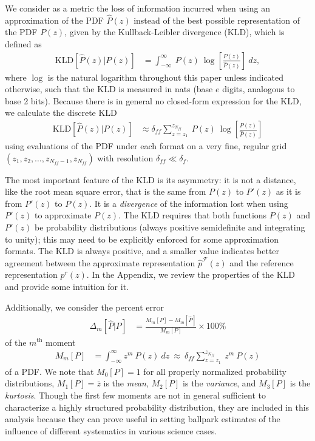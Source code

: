 \documentclass[\docopts]{\docclass}
\begin{document}
We consider as a metric the loss of information incurred when using an 
approximation of the PDF $\hat{P}(z)$ instead of the best possible 
representation of the  PDF $P(z)$, given by the Kullback-Leibler divergence 
(KLD), which is defined as
\begin{align}
  \label{eq:kld}
  \mathrm{KLD}[\hat{P}(z) | P(z)] &= \int_{-\infty}^{\infty}\ P(z)\ 
\log\left[\frac{P(z)}{\hat{P}(z)}\right]\ dz,
\end{align}
where $\log$ is the natural logarithm throughout this paper unless indicated 
otherwise, such that the KLD is measured in nats (base $e$ digits, analogous to 
base 2 bits).
Because there is in general no closed-form expression for the KLD, we calculate 
the discrete KLD
\begin{align}
  \label{eq:kld_approx}
  \mathrm{KLD}[\hat{P}(z) | P(z)] &\approx 
\delta_{ff}\sum_{z=z_{1}}^{z_{N_{ff}}}\ P(z)\ 
\log\left[\frac{P(z)}{\hat{P}(z)}\right]
\end{align}
using evaluations of the PDF under each format on a very fine, regular grid 
$(z_{1}, z_{2}, \dots, z_{N_{ff}-1}, z_{N_{ff}})$ with resolution $\delta_{ff} 
\ll \delta_{f}$.

The most important feature of the KLD is its asymmetry: it is not a distance, 
like the root mean square error, that is the same from $P(z)$ to $P'(z)$ as it 
is from $P'(z)$ to $P(z)$.
It is a \textit{divergence} of the information lost when using $P'(z)$ to 
approximate $P(z)$.
The KLD requires that both functions $P(z)$ and $P'(z)$ be probability 
distributions (always positive semidefinite and integrating to unity); this may 
need to be explicitly enforced for some approximation formats.
The KLD is always positive, and a smaller value indicates better agreement 
between the approximate representation $\hat{p}^{\mathcal{F}}(z)$ and the 
reference representation $p^{r}(z)$.
In the Appendix, we review the properties of the KLD and provide some intuition 
for it.

Additionally, we consider the percent error
\begin{align}
  \label{eq:percent_error}
  \Delta_{m}[\hat{P} | P] &= \frac{M_{m}[P] - 
M_{m}[\hat{P}]}{M_{m}[P]}\times100\%
\end{align}
of the $m^{\mathrm{th}}$ moment
\begin{align}
  \label{eq:moment}
  M_{m}[P] &= \int_{-\infty}^{\infty} z^{m}\ P(z)\ dz\ \approx\  
\delta_{ff}\sum_{z=z_{1}}^{z_{N_{ff}}}\ z^{m}\ P(z)
\end{align}
of a PDF.
We note that $M_{0}[P]=1$ for all properly normalized probability 
distributions, $M_{1}[P]=\bar{z}$ is the \textit{mean}, $M_{2}[P]$ is the 
\textit{variance}, and $M_{3}[P]$ is the \textit{kurtosis}.
Though the first few moments are not in general sufficient to characterize a 
highly structured probability distribution, they are included in this analysis 
because they can prove useful in setting ballpark estimates of the influence of 
different systematics in various science cases.
\end{document}
